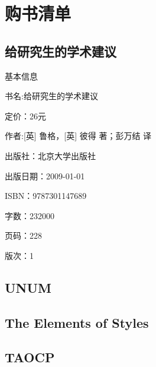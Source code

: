\chapter{购书清单}


\section{  给研究生的学术建议}
基本信息

书名:给研究生的学术建议

定价：26元

作者:[英] 鲁格，[英] 彼得 著；彭万结 译

出版社：北京大学出版社

出版日期：2009-01-01

ISBN：9787301147689

字数：232000

页码：228

版次：1




\section{UNUM}

\section{The Elements of Styles }

\section{TAOCP}

\section{ }